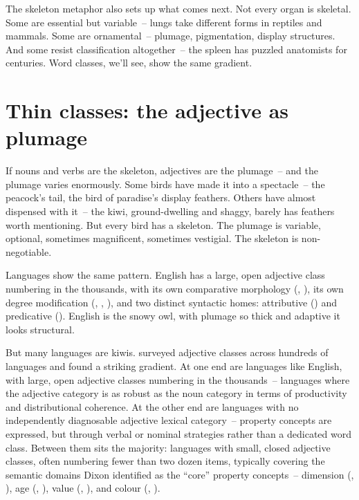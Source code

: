 The skeleton metaphor also sets up what comes next. Not every organ is skeletal. Some are essential but variable~-- lungs take different forms in reptiles and mammals. Some are ornamental~-- plumage, pigmentation, display structures. And some resist classification altogether~-- the spleen has puzzled anatomists for centuries. Word classes, we'll see, show the same gradient.


\section{Thin classes: the adjective as plumage}
\label{sec:11:thin-kinds}


If nouns and verbs are the skeleton, adjectives are the plumage~-- and the plumage varies enormously. Some birds have made it into a spectacle~-- the peacock's tail, the bird of paradise's display feathers. Others have almost dispensed with it~-- the kiwi, ground-dwelling and shaggy, barely has feathers worth mentioning. But every bird has a skeleton. The plumage is variable, optional, sometimes magnificent, sometimes vestigial. The skeleton is non-negotiable.

Languages show the same pattern. English has a large, open adjective class numbering in the thousands, with its own comparative morphology (, ), its own degree modification (, , ), and two distinct syntactic homes: attributive () and predicative (). English is the snowy owl, with plumage so thick and adaptive it looks structural.

But many languages are kiwis. \textcite{dixon2004} surveyed adjective classes across hundreds of languages and found a striking gradient. At one end are languages like English, with large, open adjective classes numbering in the thousands~-- languages where the adjective category is as robust as the noun category in terms of productivity and distributional coherence. At the other end are languages with no independently diagnosable adjective lexical category~-- property concepts are expressed, but through verbal or nominal strategies rather than a dedicated word class. Between them sits the majority: languages with small, closed adjective classes, often numbering fewer than two dozen items, typically covering the semantic domains Dixon identified as the \enquote{core} property concepts~-- dimension (, ), age (, ), value (, ), and colour (, ).

